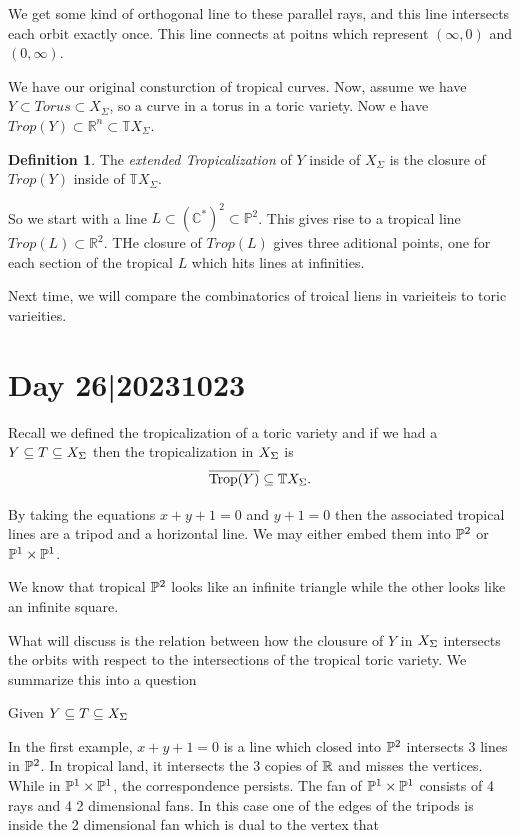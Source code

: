 \documentclass[12pt]{memoir}
\DeclareMathOperator{\Trop}{Trop}
\theoremstyle{definition}
\newtheorem{protodefinition}{Definition}[section]
\newenvironment{define}
   {\begin{protodefinition}}
   {\end{protodefinition}}
\def\RR{{\mathbb R}}
\def\CC{{\mathbb C}}
\def\TT{{\mathbb T}}
\def\PP{{\mathbb P}}
\begin{document}
We get some kind of orthogonal line to these parallel rays, and this line intersects each orbit exactly once. This line connects at poitns which represent $(\infty,0)$ and $(0, \infty)$. 


We have our original consturction of tropical curves. Now, assume we have $Y \subset Torus \subset X_\Sigma$, so a curve in a torus in a toric variety. Now e have $Trop(Y) \subset \RR^n \subset \TT X_\Sigma$. 

\begin{define}
    The \emph{extended Tropicalization} of $Y$ inside of $X_\Sigma$ is the closure of $Trop(Y)$ inside of $\TT X_\Sigma$.
\end{define}


So we start with a line $L \subset (\CC^*)^2 \subset \PP^2$. This gives rise to a tropical line $Trop(L) \subset \RR^2$. THe closure of $Trop(L)$ gives three aditional points, one for each section of the tropical $L$ which hits lines at infinities. 


Next time, we will compare the combinatorics of troical liens in varieiteis to toric varieities. 



\section{Day 26|20231023}

Recall we defined the tropicalization of a toric variety and if we had a $Y\subseteq T\subseteq X_\Sigma$ then the tropicalization in $X_\Sigma$ is 
$$\ov{\Trop(Y)}\subseteq \bT X_\Sg.$$
\begin{Ex}
    By taking the equations $x+y+1=0$ and $y+1=0$ then the associated tropical lines are a tripod and a horizontal line. We may either embed them into $\mathbb{P}^2$ or $\mathbb{P}^1\times\mathbb{P}^1$.\par 
    We know that tropical $\mathbb{P}^2$ looks like an infinite triangle while the other looks like an infinite square.
\end{Ex}

What will discuss is the relation between how the clousure of $Y$ in $X_\Sigma$ intersects the orbits with respect to the intersections of the tropical toric variety. We summarize this into a question 

\begin{significant}
    Given $Y\subseteq T\subseteq X_\Sigma$
\end{significant}

In the first example, $x+y+1=0$ is a line which closed into $\mathbb{P}^2$ intersects 3 lines in $\mathbb{P}^2$. In tropical land, it intersects the 3 copies of $\mathbb{R}$ and misses the vertices. While in $\mathbb{P}^1\times\mathbb{P}^1$, the correspondence persists. The fan of $\mathbb{P}^1\times\mathbb{P}^1$ consists of 4 rays and 4 2 dimensional fans. In this case one of the edges of the tripods is inside the 2 dimensional fan which is dual to the vertex that 
\end{document}
